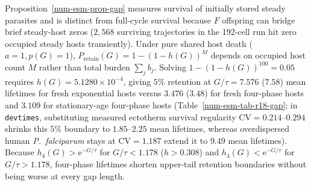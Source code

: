 Proposition~\ref{num-esm-prop-gap} measures survival of initially stored steady parasites and is distinct from full-cycle survival because $F$ offspring can bridge brief steady-host zeros ($2{,}568$ surviving trajectories in the 192-cell run hit zero occupied steady hosts transiently). Under pure shared host death ($a = 1, p(G) = 1$), $P_{\mathrm{retain}}(G) = 1 - (1 - h(G))^M$ depends on occupied host count $M$ rather than total burden $\sum_j b_j$. Solving $1 - (1 - h(G))^{100} = 0.05$ requires $h(G) = 5.1280 \times 10^{-4}$, giving $5\%$ retention at $G/\tau = 7.576$ ($7.58$) mean lifetimes for fresh exponential hosts versus $3.476$ ($3.48$) for fresh four-phase hosts and $3.109$ for stationary-age four-phase hosts (Table~\ref{num-esm-tab-r18-gap}; in \texttt{devtimes}, substituting measured ectotherm survival regularity $\mathrm{CV} = 0.214$--$0.294$ shrinks this $5\%$ boundary to $1.85$--$2.25$ mean lifetimes, whereas overdispersed human \emph{P.~falciparum} stays at $\mathrm{CV} = 1.187$ extend it to $9.49$ mean lifetimes). Because $h_4(G) > \mathrm{e}^{-G/\tau}$ for $G/\tau < 1.178$ ($h > 0.308$) and $h_4(G) < \mathrm{e}^{-G/\tau}$ for $G/\tau > 1.178$, four-phase lifetimes shorten upper-tail retention boundaries without being worse at every gap length.

